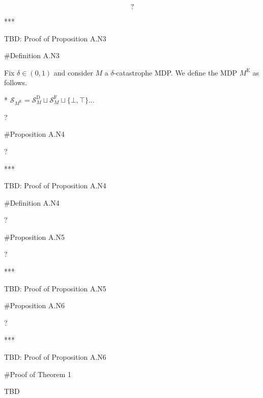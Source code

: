 \documentclass[a4paper]{article}
\newcommand{\St}{\mathcal{S}}
\newcommand{\SF}{\St^{\text{F}}}
\newcommand{\SD}{\St^{\text{D}}}
\newcommand{\MD}{M^{\text{D}}}
\newcommand{\ME}{M^{\text{E}}}
\begin{document}
$$?$$


***

TBD: Proof of Proposition A.N3

\#Definition A.N3

Fix $\delta\in(0,1)$ and consider $M$ a $\delta$-catastrophe MDP. We define the MDP $\ME$ as follows.

* $\St_{\ME} = \SD_M \sqcup \SF_M \sqcup \{\bot,\top\}$...

?

\#Proposition A.N4


?

***

TBD: Proof of Proposition A.N4

\#Definition A.N4


?

\#Proposition A.N5


?

***

TBD: Proof of Proposition A.N5

\#Proposition A.N6


?

***

TBD: Proof of Proposition A.N6

\#Proof of Theorem 1


TBD
\end{document}
